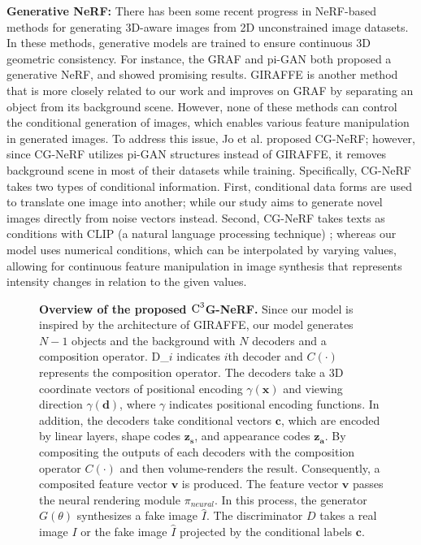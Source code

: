 \documentclass[nohyperref]{article}
\theoremstyle{plain}
\theoremstyle{definition}
\theoremstyle{remark}
\begin{document}
\textbf{Generative NeRF:} There has been some recent progress in NeRF-based methods for generating 3D-aware images from 2D unconstrained image datasets. In these methods, generative models are trained to ensure continuous 3D geometric consistency. For instance, the GRAF \cite{schwarz2020graf} and pi-GAN \cite{chan2021pi} both proposed a generative NeRF, and showed promising results. GIRAFFE is another method that is more closely related to our work and improves on GRAF by separating an object from its background scene. However, none of these methods can control the conditional generation of images, which enables various feature manipulation in generated images. To address this issue, Jo et al. proposed CG-NeRF; however, since CG-NeRF utilizes pi-GAN structures instead of GIRAFFE, it removes background scene in most of their datasets while training. Specifically, CG-NeRF takes two types of conditional information. First, conditional data forms are used to translate one image into another; while our study aims to generate novel images directly from noise vectors instead. Second, CG-NeRF takes texts as conditions with CLIP (a natural language processing technique) \cite{radford2021learning}; whereas our model uses numerical conditions, which can be interpolated by varying values, allowing for continuous feature manipulation in image synthesis that represents intensity changes in relation to the given values.

\begin{figure*}[t]
\begin{center}
\caption{\textbf{Overview of the proposed $\textnormal{C}^{3}$G-NeRF.} Since our model is inspired by the architecture of GIRAFFE, our model generates $N-1$ objects and the background with $N$ decoders and a composition operator. D\_$i$ indicates $i$th decoder and $C(\cdot)$ represents the composition operator. The decoders take a 3D coordinate vectors of positional encoding $\gamma(\textbf{x})$ and viewing direction $\gamma(\textbf{d})$, where $\gamma$ indicates positional encoding functions. In addition, the decoders take conditional vectors $\textbf{c}$, which are encoded by linear layers, shape codes $\textbf{z}_{\textbf{s}}$, and appearance codes $\textbf{z}_{\textbf{a}}$. By compositing the outputs of each decoders with the composition operator $C(\cdot)$ and then volume-renders the result. Consequently, a composited feature vector $\textbf{v}$ is produced. The feature vector $\textbf{v}$ passes the neural rendering module $\pi_{neural}$. In this process, the generator $\textit{G}(\theta)$ synthesizes a fake image $\hat{I}$. The discriminator $\textit{D}$ takes a real image $I$ or the fake image $\hat{I}$ projected by the conditional labels $\textbf{c}$.}
\label{figure_2}
\end{center}
\vskip -0.2in
\end{figure*}
\end{document}
